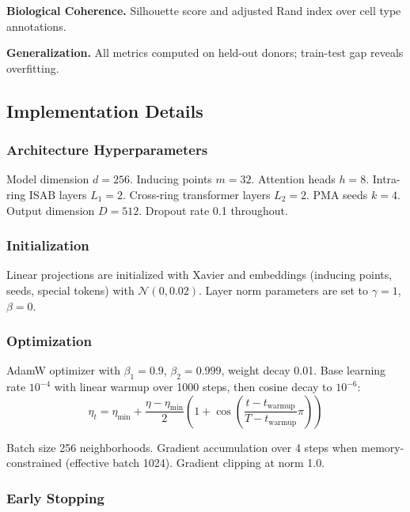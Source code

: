 \textbf{Biological Coherence.} Silhouette score and adjusted Rand index over cell type annotations.

\textbf{Generalization.} All metrics computed on held-out donors; train-test gap reveals overfitting.

\subsection{Implementation Details}

\subsubsection{Architecture Hyperparameters}

Model dimension $d = 256$. Inducing points $m = 32$. Attention heads $h = 8$. Intra-ring ISAB layers $L_1 = 2$. Cross-ring transformer layers $L_2 = 2$. PMA seeds $k = 4$. Output dimension $D = 512$. Dropout rate 0.1 throughout.

\subsubsection{Initialization}

Linear projections are initialized with Xavier and embeddings (inducing points, seeds, special tokens) with $\mathcal{N}(0, 0.02)$. Layer norm parameters are set to $\gamma = 1$, $\beta = 0$.

\subsubsection{Optimization}

AdamW optimizer with $\beta_1 = 0.9$, $\beta_2 = 0.999$, weight decay 0.01. Base learning rate $10^{-4}$ with linear warmup over 1000 steps, then cosine decay to $10^{-6}$:
\begin{equation}
    \eta_t = \eta_{\min} + \frac{\eta - \eta_{\min}}{2}\left(1 + \cos\left(\frac{t - t_{\text{warmup}}}{T - t_{\text{warmup}}}\pi\right)\right)
\end{equation}

Batch size 256 neighborhoods. Gradient accumulation over 4 steps when memory-constrained (effective batch 1024). Gradient clipping at norm 1.0.

\subsubsection{Early Stopping}

